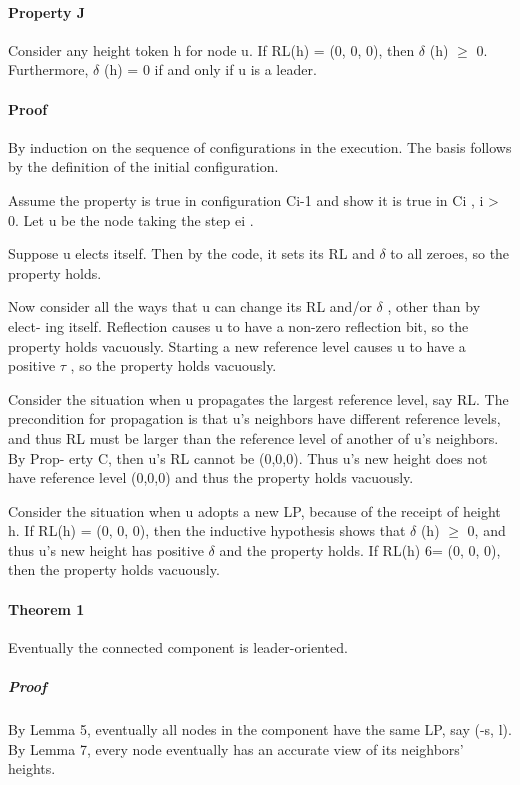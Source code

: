 \paragraph{Property J}Consider any height token h for node u. If RL(h) = (0, 0, 0), then $\delta$ (h) $\geq$ 0. Furthermore, $\delta$ (h) = 0 if and only if u is a leader.

\paragraph{Proof}By induction on the sequence of configurations in the execution. The basis follows by the definition of the initial configuration.

Assume the property is true in configuration Ci-1 and show it is true in Ci , i > 0. Let u be the node taking the step ei .

Suppose u elects itself. Then by the code, it sets its RL and $\delta$ to all zeroes, so the property holds.

Now consider all the ways that u can change its RL and/or $\delta$ , other than by elect- ing itself. Reflection causes u to have a non-zero reflection bit, so the property holds vacuously. Starting a new reference level causes u to have a positive $\tau$ , so the property holds vacuously.

Consider the situation when u propagates the largest reference level, say RL. The precondition for propagation is that u’s neighbors have different reference levels, and thus RL must be larger than the reference level of another of u’s neighbors. By Prop- erty C, then u’s RL cannot be (0,0,0). Thus u’s new height does not have reference level (0,0,0) and thus the property holds vacuously.

Consider the situation when u adopts a new LP, because of the receipt of height h. If RL(h) = (0, 0, 0), then the inductive hypothesis shows that $\delta$ (h) $\geq$ 0, and thus u’s new height has positive $\delta$ and the property holds. If RL(h) 6= (0, 0, 0), then the property holds vacuously.

\paragraph{Theorem 1}Eventually the connected component is leader-oriented.
\subparagraph{Proof}By Lemma 5, eventually all nodes in the component have the same LP, say (-s, l). By Lemma 7, every node eventually has an accurate view of its neighbors’ heights. 

